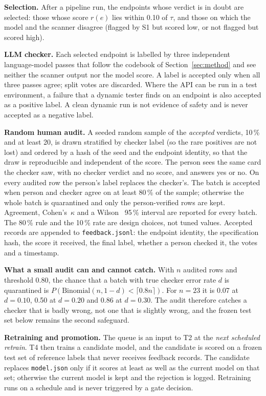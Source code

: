 \documentclass[conference]{IEEEtran}
\begin{document}
\textbf{Selection.} After a pipeline run, the endpoints whose verdict is in doubt are
selected: those whose score $r(e)$ lies within 0.10 of $\tau$, and those on which the model and the
scanner disagree (flagged by S1 but scored low, or not flagged but scored high).

\textbf{LLM checker.} Each selected endpoint is labelled by three independent
language-model passes that follow the codebook of Section~\ref{sec:method} and see neither
the scanner output nor the model score. A label is accepted only when all three passes agree;
split votes are discarded. Where the API can be run in a test environment, a failure that a
dynamic tester finds on an endpoint is also accepted as a positive label. A clean dynamic run
is not evidence of safety and is never accepted as a negative label.

\textbf{Random human audit.} A seeded random sample of the \emph{accepted} verdicts, 10\,\% and at least 20, is drawn
stratified by checker label (so the rare positives are not lost) and ordered by a hash of the seed and the endpoint identity, so that
the draw is reproducible and independent of the score. The person sees the same card the checker saw, with no checker verdict and no score,
and answers yes or no. On every audited row the person's label replaces the checker's. The batch is accepted when person and checker agree
on at least 80\,\% of the sample; otherwise the whole batch is quarantined and only the person-verified rows are kept. Agreement,
Cohen's~$\kappa$ and a Wilson~\cite{wilson} 95\,\% interval are reported for every batch. The 80\,\% rule and the 10\,\% rate are design choices, not tuned values.
Accepted records are appended to \texttt{feedback.jsonl}: the endpoint identity, the specification hash, the score it received, the final label,
whether a person checked it, the votes and a timestamp.

\textbf{What a small audit can and cannot catch.} With $n$ audited rows and threshold 0.80, the chance that a batch with true checker error rate $d$ is
quarantined is $P(\mathrm{Binomial}(n,1-d)<\lceil 0.8n\rceil)$. For $n=23$ it is 0.07 at $d=0.10$, 0.50 at $d=0.20$ and 0.86 at $d=0.30$. The audit therefore
catches a checker that is badly wrong, not one that is slightly wrong, and the frozen test set below remains the second safeguard.

\textbf{Retraining and promotion.} The queue is an input to T2 at the \emph{next scheduled
retrain}. T4 then trains a candidate model, and the candidate is scored on a frozen test set
of reference labels that never receives feedback records. The candidate replaces
\texttt{model.json} only if it scores at least as well as the current model on that set;
otherwise the current model is kept and the rejection is logged. Retraining runs on a
schedule and is never triggered by a gate decision.
\end{document}
